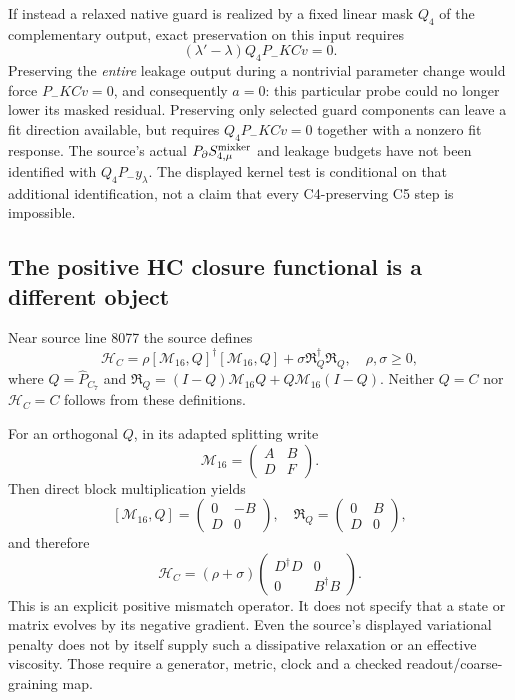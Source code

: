 \documentclass[11pt,a4paper]{article}
\begin{document}
If instead a relaxed native guard is realized by a fixed linear mask
$Q_4$ of the complementary output, exact preservation on this input
requires
\[
 (\lambda'-\lambda)Q_4P_-KCv=0.
\]
Preserving the \emph{entire} leakage output during a nontrivial parameter
change would force $P_-KCv=0$, and consequently $a=0$: this particular
probe could no longer lower its masked residual. Preserving only selected
guard components can leave a fit direction available, but requires
$Q_4P_-KCv=0$ together with a nonzero fit response.
The source's actual $P_\partial S_{4,\mu}^{\rm mixker}$ and leakage
budgets have not been identified with $Q_4P_-y_\lambda$. The displayed
kernel test is conditional on that additional identification, not a
claim that every C4-preserving C5 step is impossible.

\subsection{The positive HC closure functional is a different object}
Near source line 8077 the source defines
\[
 \mathcal H_C=\rho[\mathcal M_{16},Q]^\dagger[\mathcal M_{16},Q]
 +\sigma\mathfrak R_Q^\dagger\mathfrak R_Q,\quad \rho,\sigma\ge0,
\]
where $Q=\hat P_{C_7}$ and
$\mathfrak R_Q=(I-Q)\mathcal M_{16}Q+Q\mathcal M_{16}(I-Q)$.
Neither $Q=C$ nor $\mathcal H_C=C$ follows from these definitions.

For an orthogonal $Q$, in its adapted splitting write
\[
 \mathcal M_{16}=\begin{pmatrix}A&B\\D&F\end{pmatrix}.
\]
Then direct block multiplication yields
\[
 [\mathcal M_{16},Q]=\begin{pmatrix}0&-B\\D&0\end{pmatrix},
 \quad\mathfrak R_Q=\begin{pmatrix}0&B\\D&0\end{pmatrix},
\]
and therefore
\[
 \mathcal H_C=(\rho+\sigma)
 \begin{pmatrix}D^\dagger D&0\\0&B^\dagger B\end{pmatrix}.
\]
This is an explicit positive mismatch operator. It does not specify that
a state or matrix evolves by its negative gradient. Even the source's
displayed variational penalty does not by itself supply such a
dissipative relaxation or an effective viscosity. Those require a
generator, metric, clock and a checked readout/coarse-graining map.
\end{document}
